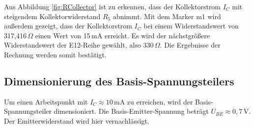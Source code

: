 Aus Abbildung \ref{fig:RCollector} ist zu erkennen, dass der Kollektorstrom $I_C$ mit steigendem Kollektorwiderstand $R_5$ abnimmt. Mit dem Marker m1 wird außerdem
gezeigt, dass der Kollektorstrom $I_C$ bei einem Widerstandswert von 317{,}416\,\(\Omega\) einen Wert von 15\,mA erreicht. Es wird der nächstgrößere Widerstandswert der E12-Reihe gewählt, also 330\,\(\Omega\).
Die Ergebnisse der Rechnung werden somit bestätigt.

\subsection{Dimensionierung des Basis-Spannungsteilers}
\label{sec:dimensionierung_basis_spannungsteiler}

Um einen Arbeitspunkt mit $I_C \approx 10\,\mathrm{mA}$ zu erreichen, wird der Basis-Spannungsteiler dimensioniert. Die Basis-Emitter-Spannung beträgt $U_{BE} \approx 0{,}7\,\mathrm{V}$. Der Emitterwiderstand wird hier vernachlässigt.

%
%
%
%
%
%


